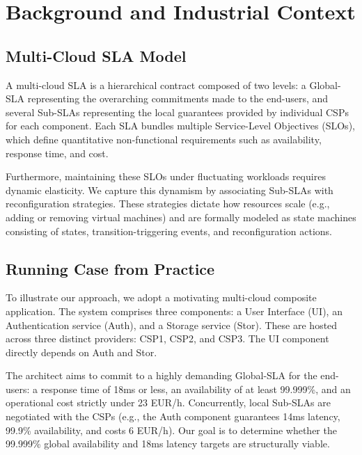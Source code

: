 \documentclass[conference]{IEEEtran}
\begin{document}
\section{Background and Industrial Context}\label{sec:context}

\subsection{Multi-Cloud SLA Model}\label{sec:model}
A multi-cloud SLA is a hierarchical contract composed of two levels: a Global-SLA representing the overarching commitments made to the end-users, and several Sub-SLAs representing the local guarantees provided by individual CSPs for each component. Each SLA bundles multiple Service-Level Objectives (SLOs), which define quantitative non-functional requirements such as availability, response time, and cost.

Furthermore, maintaining these SLOs under fluctuating workloads requires dynamic elasticity. We capture this dynamism by associating Sub-SLAs with reconfiguration strategies. These strategies dictate how resources scale (e.g., adding or removing virtual machines) and are formally modeled as state machines consisting of states, transition-triggering events, and reconfiguration actions.

\subsection{Running Case from Practice}\label{sec:case}
To illustrate our approach, we adopt a motivating multi-cloud composite application. The system comprises three components: a User Interface (UI), an Authentication service (Auth), and a Storage service (Stor). These are hosted across three distinct providers: CSP1, CSP2, and CSP3. The UI component directly depends on Auth and Stor. 

The architect aims to commit to a highly demanding Global-SLA for the end-users: a response time of 18ms or less, an availability of at least 99.999\%, and an operational cost strictly under 23 EUR/h. Concurrently, local Sub-SLAs are negotiated with the CSPs (e.g., the Auth component guarantees 14ms latency, 99.9\% availability, and costs 6 EUR/h). Our goal is to determine whether the 99.999\% global availability and 18ms latency targets are structurally viable.
\end{document}
